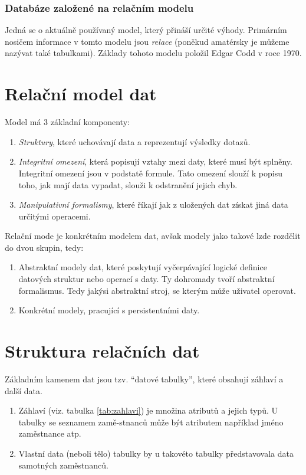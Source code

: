 \subsubsection{Databáze založené na relačním modelu}
Jedná se o aktuálně používaný model, který přináší určité výhody. Primárním nosičem informace v tomto modelu jsou \textit{relace} (poněkud amatérsky je můžeme nazývat také tabulkami). Základy tohoto modelu položil Edgar Codd v roce 1970.


\section{Relační model dat}
Model má 3 základní komponenty:
\begin{enumerate}
\item \textit{Struktury}, které uchovávají data a reprezentují výsledky dotazů.
\item \textit{Integritní omezení}, která popisují vztahy mezi daty, které musí být splněny. Integritní omezení jsou v podstatě formule. Tato omezení slouží k popisu toho, jak mají data vypadat, slouži k odstranění jejich chyb.
\item \textit{Manipulativní formalismy}, které říkají jak z uložených dat získat jiná data určitými operacemi.
\end{enumerate}
Relační mode je konkrétním modelem dat, avšak modely jako takové lzde rozdělit do dvou skupin, tedy:
\begin{enumerate}
\item Abstraktní modely dat, které poskytují vyčerpávající logické definice datových struktur nebo operací s daty. Ty dohromady tvoří abstraktní formalismus. Tedy jakýsi abstraktní stroj, se kterým může uživatel operovat.
\item Konkrétní modely, pracující s persistentními daty.
\end{enumerate}

\section{Struktura relačních dat}
Základním kamenem dat jsou tzv. \enquote{datové tabulky}, které obsahují záhlaví a další data.
\begin{enumerate}
\item Záhlaví (viz. tabulka \ref{tab:zahlavi}) je množina atributů a jejich typů. U tabulky se seznamem zamě-stnanců může být atributem například jméno zaměstnance atp.
\item Vlastní data (neboli tělo) tabulky by u takovéto tabulky představovala data samotných zaměstnanců.
\end{enumerate}

